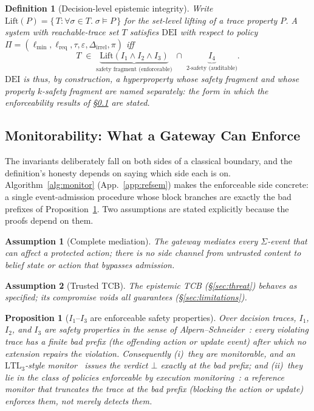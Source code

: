 \documentclass[conference]{IEEEtran}
\newtheorem{definition}{Definition}
\newtheorem{proposition}{Proposition}
\newtheorem{assumption}{Assumption}
\newcommand{\Ione}{\ensuremath{I_1}}
\newcommand{\Itwo}{\ensuremath{I_2}}
\newcommand{\Ithree}{\ensuremath{I_3}}
\newcommand{\Ifour}{\ensuremath{I_4}}
\newcommand{\lmin}{\ensuremath{\ell_{\min}}}
\newcommand{\lreq}{\ensuremath{\ell_{\mathrm{req}}}}
\newcommand{\Dirrel}{\ensuremath{\Delta_{\mathrm{irrel}}}}
\newcommand{\DEI}{\ensuremath{\mathrm{DEI}}}
\begin{document}
\begin{definition}[Decision-level epistemic integrity]
\label{def:dei}
Write $\mathrm{Lift}(P) = \{\,T : \forall \sigma \in T.\; \sigma \models P\,\}$
for the set-level lifting of a trace property $P$. A system with
reachable-trace set $T$ satisfies \DEI{} with respect to policy
$\Pi = (\lmin, \lreq, \tau, \varepsilon, \Dirrel, \pi)$ iff
\[
T \;\in\; \underbrace{\mathrm{Lift}(\Ione \wedge \Itwo \wedge \Ithree)}_{\text{safety fragment (enforceable)}} \;\cap\; \underbrace{\Ifour}_{\text{2-safety (auditable)}} .
\]
\DEI{} is thus, by construction, a hyperproperty whose safety
fragment and whose properly $k$-safety fragment are named
separately: the form in which the enforceability results of
\S\ref{sec:monitorability} are stated.
\end{definition}

\subsection{Monitorability: What a Gateway Can Enforce}
\label{sec:monitorability}
The invariants deliberately fall on both sides of a classical
boundary, and the definition's honesty depends on saying which
side each is on. Algorithm~\ref{alg:monitor} (App.~\ref{app:refsem}) makes the
enforceable side concrete: a single event-admission procedure whose block
branches are exactly the bad prefixes of
Proposition~\ref{prop:safety}. Two assumptions are stated
explicitly because the proofs depend on them.

\begin{assumption}[Complete mediation]
\label{asm:mediation}
The gateway mediates every $\Sigma$-event that can affect a
protected action; there is no side channel from untrusted content
to belief state or action that bypasses admission.
\end{assumption}

\begin{assumption}[Trusted TCB]
\label{asm:recorded}
The epistemic TCB (\S\ref{sec:threat}) behaves as specified; its
compromise voids all guarantees (\S\ref{sec:limitations}).
\end{assumption}



\begin{proposition}[\Ione--\Ithree{} are enforceable safety properties]
\label{prop:safety}
Over decision traces, \Ione, \Itwo, and \Ithree{} are safety
properties in the sense of Alpern--Schneider~\cite{alpern}: every
violating trace has a finite bad prefix (the offending action or
update event) after which no extension repairs the violation.
Consequently (i)~they are monitorable, and an
$\mathrm{LTL}_3$-style monitor~\cite{bauer,pnueli} issues the
verdict $\bot$ exactly at the bad prefix; and (ii)~they lie in
the class of policies enforceable by execution
monitoring~\cite{schneider}: a reference monitor that truncates
the trace at the bad prefix (blocking the action or
update) enforces them, not merely detects them.
\end{proposition}
\end{document}

